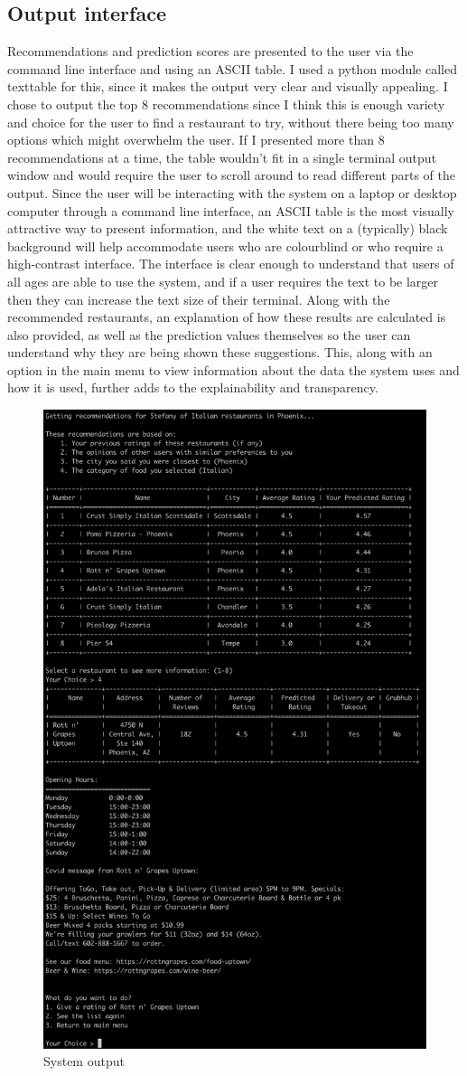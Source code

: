\documentclass[conference]{IEEEtran}
\begin{document}
\subsection{Output interface}
Recommendations and prediction scores are presented to the user via the command line interface and using an ASCII table. 
I used a python module called texttable for this, since it makes the output very clear and visually appealing. 
I chose to output the top 8 recommendations since I think this is enough variety and choice for the user to find 
a restaurant to try, without there being too many options which might overwhelm the user. 
If I presented more than 8 recommendations at a time, the table wouldn't fit in a single terminal output window and 
would require the user to scroll around to read different parts of the output. 
Since the user will be interacting with the system on a laptop or desktop computer through a command line interface, 
an ASCII table is the most visually attractive way to present information, and the white text on a (typically) black 
background will help accommodate users who are colourblind or who require a high-contrast interface. 
The interface is clear enough to understand that users of all ages are able to use the system, and if a user 
requires the text to be larger then they can increase the text size of their terminal. 
Along with the recommended restaurants, an explanation of how these results are calculated is also provided, as 
well as the prediction values themselves so the user can understand why they are being shown these suggestions. 
This, along with an option in the main menu to view information about the data the system uses and how it is used, 
further adds to the explainability and transparency. 
\begin{figure}
    \centering
    \includegraphics[width=0.4\linewidth]{output.png}
    \caption{System output}
    \label{fig:output}
\end{figure}
\end{document}
